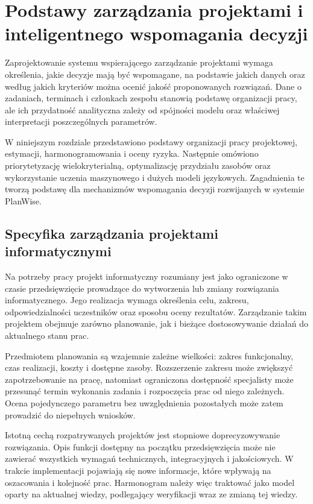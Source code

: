 \chapter{Podstawy zarządzania projektami i inteligentnego wspomagania decyzji}
\label{chap:podstawy}

Zaprojektowanie systemu wspierającego zarządzanie projektami wymaga określenia, jakie decyzje mają być wspomagane, na podstawie jakich danych oraz według jakich kryteriów można ocenić jakość proponowanych rozwiązań. Dane o zadaniach, terminach i członkach zespołu stanowią podstawę organizacji pracy, ale ich przydatność analityczna zależy od spójności modelu oraz właściwej interpretacji poszczególnych parametrów.

W niniejszym rozdziale przedstawiono podstawy organizacji pracy projektowej, estymacji, harmonogramowania i oceny ryzyka. Następnie omówiono priorytetyzację wielokryterialną, optymalizację przydziału zasobów oraz wykorzystanie uczenia maszynowego i dużych modeli językowych. Zagadnienia te tworzą podstawę dla mechanizmów wspomagania decyzji rozwijanych w systemie PlanWise.


\section{Specyfika zarządzania projektami informatycznymi}
\label{sec:specyfika-projektow}

Na potrzeby pracy projekt informatyczny rozumiany jest jako ograniczone w czasie przedsięwzięcie prowadzące do wytworzenia lub zmiany rozwiązania informatycznego. Jego realizacja wymaga określenia celu, zakresu, odpowiedzialności uczestników oraz sposobu oceny rezultatów. Zarządzanie takim projektem obejmuje zarówno planowanie, jak i bieżące dostosowywanie działań do aktualnego stanu prac.

Przedmiotem planowania są wzajemnie zależne wielkości: zakres funkcjonalny, czas realizacji, koszty i dostępne zasoby. Rozszerzenie zakresu może zwiększyć zapotrzebowanie na pracę, natomiast ograniczona dostępność specjalisty może przesunąć termin wykonania zadania i rozpoczęcia prac od niego zależnych. Ocena pojedynczego parametru bez uwzględnienia pozostałych może zatem prowadzić do niepełnych wniosków.

Istotną cechą rozpatrywanych projektów jest stopniowe doprecyzowywanie rozwiązania. Opis funkcji dostępny na początku przedsięwzięcia może nie zawierać wszystkich wymagań technicznych, integracyjnych i jakościowych. W trakcie implementacji pojawiają się nowe informacje, które wpływają na oszacowania i kolejność prac. Harmonogram należy więc traktować jako model oparty na aktualnej wiedzy, podlegający weryfikacji wraz ze zmianą tej wiedzy.

